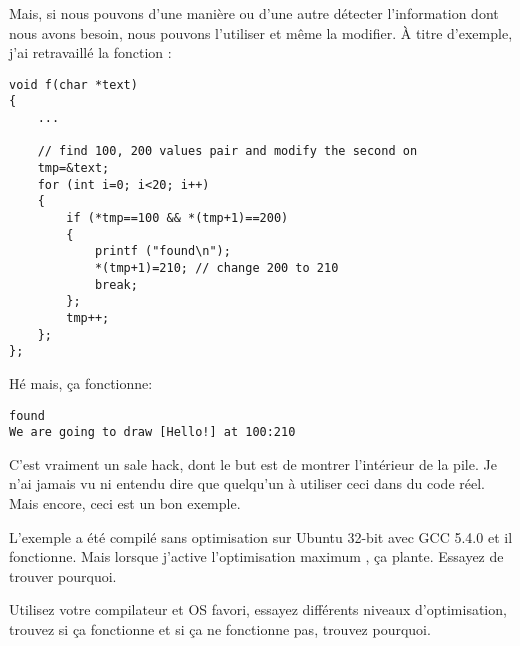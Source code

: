 Mais, si nous pouvons d'une manière ou d'une autre détecter l'information dont nous
avons besoin, nous pouvons l'utiliser et même la modifier.
À titre d'exemple, j'ai retravaillé la fonction :

\begin{lstlisting}[style=customc]
void f(char *text)
{
	...

	// find 100, 200 values pair and modify the second on
	tmp=&text;
	for (int i=0; i<20; i++)
	{
		if (*tmp==100 && *(tmp+1)==200)
		{
			printf ("found\n");
			*(tmp+1)=210; // change 200 to 210
			break;
		};
		tmp++;
	};
};
\end{lstlisting}

Hé mais, ça fonctionne:

\begin{lstlisting}
found
We are going to draw [Hello!] at 100:210
\end{lstlisting}


C'est vraiment un sale hack, dont le but est de montrer l'intérieur de la pile.
Je n'ai jamais vu ni entendu dire que quelqu'un à utiliser ceci dans du code réel.
Mais encore, ceci est un bon exemple.

\myparagraph{\Exercise}

L'exemple a été compilé sans optimisation sur Ubuntu 32-bit avec GCC 5.4.0 et il
fonctionne.
Mais lorsque j'active l'optimisation maximum , ça plante.
Essayez de trouver pourquoi.

Utilisez votre compilateur et OS favori, essayez différents niveaux d'optimisation,
trouvez si ça fonctionne et si ça ne fonctionne pas, trouvez pourquoi.
